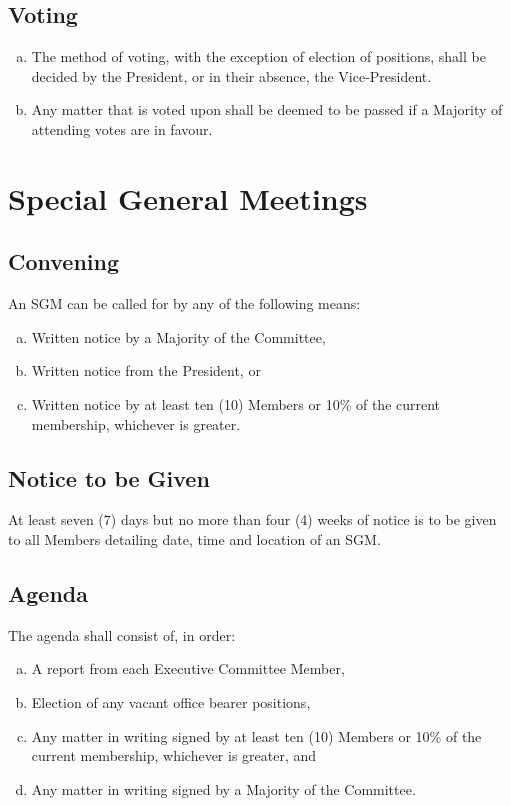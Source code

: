 \documentclass[a4paper,12pt]{article}
\begin{document}
\subsection{Voting}

\begin{enumerate}[a)]
	\item The method of voting, with the exception of election of positions, shall be decided by the President, or in their absence, the Vice-President.
	\item Any matter that is voted upon shall be deemed to be passed if a Majority of attending votes are in favour.
\end{enumerate}

\section{Special General Meetings}

\subsection{Convening}

An SGM can be called for by any of the following means:

\begin{enumerate}[a)]
	\item Written notice by a Majority of the Committee,
	\item Written notice from the President, or
	\item Written notice by at least ten (10) Members or 10\% of the current membership, whichever is greater.
\end{enumerate}

\subsection{Notice to be Given}

At least seven (7) days but no more than four (4) weeks of notice is to be given to all Members detailing date, time and location of an SGM.

\subsection{Agenda}

The agenda shall consist of, in order:

\begin{enumerate}[a)]
	\item A report from each Executive Committee Member,
	\item Election of any vacant office bearer positions,
	\item Any matter in writing signed by at least ten (10) Members or 10\% of the current membership, whichever is greater, and
	\item Any matter in writing signed by a Majority of the Committee.
\end{enumerate}
\end{document}
